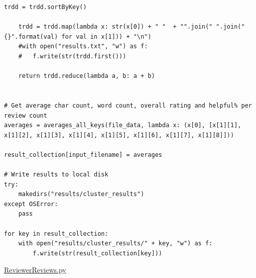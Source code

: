\documentclass{scrartcl}
\theoremstyle{my_th_style}
\begin{document}
\begin{lstlisting}[breaklines=true]
	trdd = trdd.sortByKey()

	trdd = trdd.map(lambda x: str(x[0]) + " "  + "".join(" ".join("{}".format(val) for val in x[1])) + "\n")
	#with open("results.txt", "w") as f:
	#	f.write(str(trdd.first()))
	
	return trdd.reduce(lambda a, b: a + b)
	

# Get average char count, word count, overall rating and helpful% per review count
averages = averages_all_keys(file_data, lambda x: (x[0], [x[1][1], x[1][2], x[1][3], x[1][4], x[1][5], x[1][6], x[1][7], x[1][8]])) 

result_collection[input_filename] = averages

# Write results to local disk
try:
	makedirs("results/cluster_results")
except OSError:
	pass

for key in result_collection:
	with open("results/cluster_results/" + key, "w") as f:
		f.write(str(result_collection[key]))

\end{lstlisting}
\newpage
\underline{ReviewerReviews.py}
\end{document}

